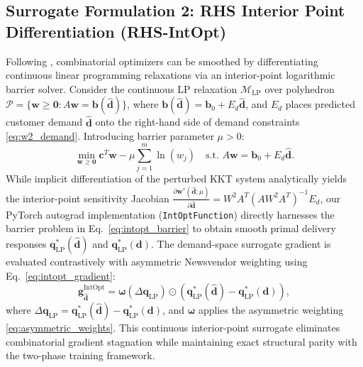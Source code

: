 \documentclass[11pt,a4paper]{article}
\theoremstyle{definition}
\theoremstyle{remark}
\begin{document}
\subsection{Surrogate Formulation 2: RHS Interior Point Differentiation (RHS-IntOpt)}
\label{sec:intopt}
Following \citet{mandi2020interior}, combinatorial optimizers can be smoothed by differentiating continuous linear programming relaxations via an interior-point logarithmic barrier solver. Consider the continuous LP relaxation $\mathcal{M}_{\text{LP}}$ over polyhedron $\mathcal{P} = \{\mathbf{w} \ge \mathbf{0} : A \mathbf{w} = \mathbf{b}(\hat{\mathbf{d}})\}$, where $\mathbf{b}(\hat{\mathbf{d}}) = \mathbf{b}_0 + E_d \hat{\mathbf{d}}$, and $E_d$ places predicted customer demand $\hat{\mathbf{d}}$ onto the right-hand side of demand constraints \eqref{eq:w2_demand}. Introducing barrier parameter $\mu > 0$:
\begin{equation}
    \min_{\mathbf{w} \ge \mathbf{0}} \mathbf{c}^T \mathbf{w} - \mu \sum_{j=1}^m \ln(w_j) \quad \text{s.t. } A \mathbf{w} = \mathbf{b}_0 + E_d \hat{\mathbf{d}}. \label{eq:intopt_barrier}
\end{equation}
While implicit differentiation of the perturbed KKT system analytically yields the interior-point sensitivity Jacobian $\frac{\partial \mathbf{w}^*(\hat{\mathbf{d}}; \mu)}{\partial \hat{\mathbf{d}}} = W^2 A^T (A W^2 A^T)^{-1} E_d$, our PyTorch autograd implementation (\texttt{IntOptFunction}) directly harnesses the barrier problem in Eq.~\eqref{eq:intopt_barrier} to obtain smooth primal delivery responses $\mathbf{q}^*_{\text{LP}}(\hat{\mathbf{d}})$ and $\mathbf{q}^*_{\text{LP}}(\mathbf{d})$. The demand-space surrogate gradient is evaluated contrastively with asymmetric Newsvendor weighting using Eq.~\eqref{eq:intopt_gradient}:
\begin{equation}
    \mathbf{g}_{\hat{\mathbf{d}}}^{\text{IntOpt}} = \boldsymbol{\omega}(\Delta \mathbf{q}_{\text{LP}}) \odot \left( \mathbf{q}^*_{\text{LP}}(\hat{\mathbf{d}}) - \mathbf{q}^*_{\text{LP}}(\mathbf{d}) \right), \label{eq:intopt_gradient}
\end{equation}
where $\Delta \mathbf{q}_{\text{LP}} = \mathbf{q}^*_{\text{LP}}(\hat{\mathbf{d}}) - \mathbf{q}^*_{\text{LP}}(\mathbf{d})$, and $\boldsymbol{\omega}$ applies the asymmetric weighting \eqref{eq:asymmetric_weights}. This continuous interior-point surrogate eliminates combinatorial gradient stagnation while maintaining exact structural parity with the two-phase training framework.
\end{document}
